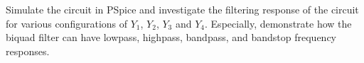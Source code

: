 \documentclass[11pt]{article}
\begin{document}
\begin{question}
    \begin{subquestion}{Simulate the circuit in PSpice and investigate the filtering response of the circuit for various configurations of $Y_1$, $Y_2$, $Y_3$ and $Y_4$. Especially, demonstrate how the biquad filter can have lowpass, highpass, bandpass, and bandstop frequency responses.}
\end{subquestion}
\end{question}
\end{document}

